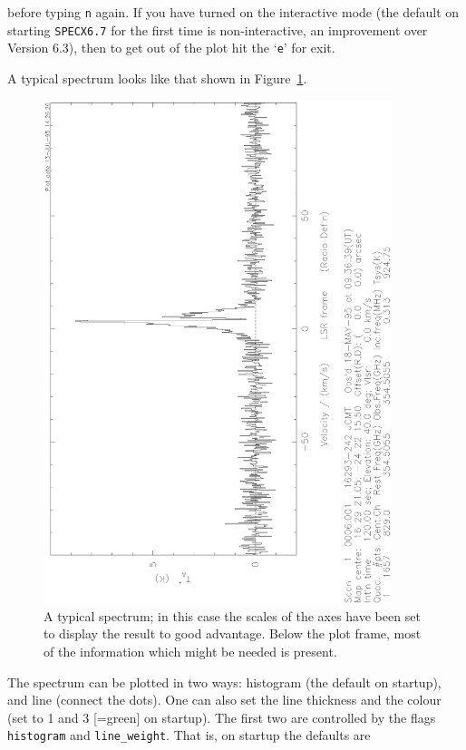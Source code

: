 \documentclass[11pt,twoside]{article}
\newcommand{\SPECX}{{\tt SPECX}}
\begin{document}
before typing {\tt n} again. If you have turned on the interactive
mode (the default on starting \SPECX {\tt 6.7} for the first time is
non-interactive, an improvement over Version 6.3), then to get out of
the plot hit the `{\tt{e}}' for exit.

A typical spectrum looks like that shown in
Figure~\ref{fig:specx_plot}.
%
\begin{figure}[htb]
\centering
\includegraphics[angle=-90,width=4in]{sc8_spectrum.ps}
\vspace*{-0.5cm}
\begin{center}
\begin{minipage}[t]{5in}
\caption[A typical plot]
{\small{A typical spectrum; in this case the scales of the axes have
been set to display the result to good advantage. Below the plot
frame, most of the information which might be needed is present.}  }
\label{fig:specx_plot}
\end{minipage}
\end{center}
\end{figure}

The spectrum can be plotted in two ways: histogram (the default on
startup), and line (connect the dots). One can also set the line
thickness and the colour (set to 1 and 3 [=green] on startup). 
The first two are controlled by the flags
{\tt histogram} and {\tt line\_weight}. That is, on startup the
defaults are
\end{document}
